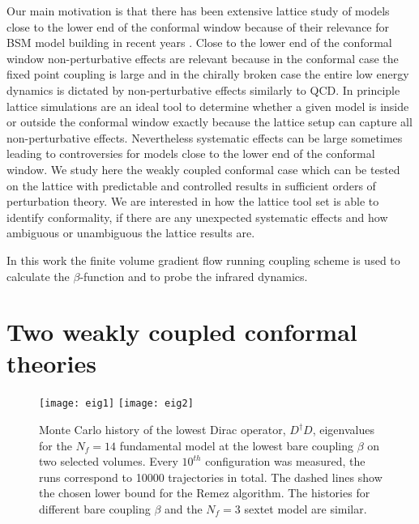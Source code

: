 \documentclass[epj]{webofc}
\begin{document}
Our main motivation is that there has been extensive lattice study of models close to the lower end of the conformal
window because of their relevance for BSM model building in recent years \cite{Nogradi:2016qek}. 
Close to the lower end of the conformal window
non-perturbative effects are relevant because in the conformal case the fixed point coupling is large and in the chirally
broken case the entire low energy dynamics is dictated by non-perturbative effects similarly to QCD. In principle
lattice simulations are an ideal tool to determine whether a given model is inside or outside the conformal window
exactly because the lattice setup can capture all non-perturbative effects. 
Nevertheless systematic effects can be large sometimes leading to
controversies for models close to the lower end
of the conformal window. 
We study here the weakly coupled conformal case which can be
tested on the lattice with predictable and controlled results in sufficient
orders of perturbation theory.
We are interested in how the lattice tool set
is able to identify conformality, if there are any unexpected systematic effects and how ambiguous or unambiguous the
lattice results are.

In this work the finite volume gradient flow \cite{Luscher:2010iy} running coupling 
scheme \cite{Fodor:2012td, Fodor:2012qh} is used 
to calculate the $\beta$-function and to probe the infrared dynamics.

\section{Two weakly coupled conformal theories}
\label{twomodels}

\begin{figure}
\centering
\texttt{[image: eig1]} \texttt{[image: eig2]}
\caption{Monte Carlo history of the lowest Dirac operator, $D^\dagger D$, eigenvalues for the $N_f = 14$ fundamental
model at the lowest bare coupling
$\beta$ on two selected volumes. Every $10^{th}$ configuration was measured, the runs correspond
to 10000 trajectories in total. The dashed lines show the chosen lower bound 
for the Remez algorithm. The histories for different bare coupling $\beta$ and the $N_f = 3$ sextet model are similar.}
\label{eigs}
\end{figure}
\end{document}
